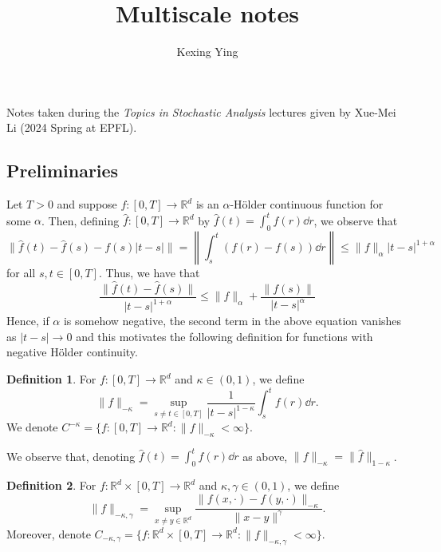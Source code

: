 \documentclass[]{article}
\theoremstyle{definition}
\theoremstyle{definition}
\newtheorem{definition}{Definition}
\begin{document}
\title{Multiscale notes}
\author{Kexing Ying}
\maketitle

Notes taken during the \textit{Topics in Stochastic Analysis} lectures given by Xue-Mei Li 
(2024 Spring at EPFL).

\subsection*{Preliminaries}

Let \(T > 0\) and suppose \(f : [0, T] \to \mathbb{R}^d\) is an \(\alpha\)-H\"older 
continuous function for some \(\alpha\). Then, defining \(\hat f : [0, T] \to \mathbb{R}^d\) by 
\(\hat f(t) = \int_0^t f(r) \dd r\), we observe that
\[\|\hat f(t) - \hat f(s) - f(s)|t - s|\| = \left\|\int_s^t (f(r) - f(s)) \dd r\right\| \le \|f\|_{\alpha}|t - s|^{1 + \alpha}\]
for all \(s, t \in [0, T]\). Thus, we have that 
\begin{equation}\label{eq:hatfholder}
  \frac{\|\hat f(t) - \hat f(s)\|}{|t - s|^{1 + \alpha}} \le \|f\|_{\alpha} + \frac{\|f(s)\|}{|t - s|^{\alpha}}
\end{equation}
Hence, if \(\alpha\) is somehow negative, the second term in the above equation vanishes as \(|t - s| \to 0\) 
and this motivates the following definition for functions with negative H\"older continuity.

\begin{definition}
  For \(f : [0, T] \to \mathbb{R}^d\) and \(\kappa \in (0, 1)\), we define 
  \[\|f\|_{-\kappa} = \sup_{s \neq t \in [0, T]} \frac{1}{|t - s|^{1 - \kappa}} \int_s^t f(r) \dd r.\]
  We denote \(C^{-\kappa} = \{f : [0, T] \to \mathbb{R}^d : \|f\|_{-\kappa} < \infty\}.\)
\end{definition}

We observe that, denoting \(\hat f(t) = \int_0^t f(r) \dd r\) as above, 
\(\|f\|_{- \kappa} = \|\hat f\|_{1 - \kappa}\).

\begin{definition}
  For \(f : \mathbb{R}^d \times [0, T] \to \mathbb{R}^d\) and \(\kappa, \gamma \in (0, 1)\), we define 
  \[\|f\|_{-\kappa, \gamma} = \sup_{x \neq y \in \mathbb{R}^d} \frac{\|f(x, \cdot) - f(y, \cdot)\|_{-\kappa}}{\|x - y\|^\gamma}.\]
  Moreover, denote \(C_{- \kappa, \gamma} = \{f : \mathbb{R}^d \times [0, T] \to \mathbb{R}^d : \|f\|_{-\kappa, \gamma} < \infty\}\).
\end{definition}
\end{document}

